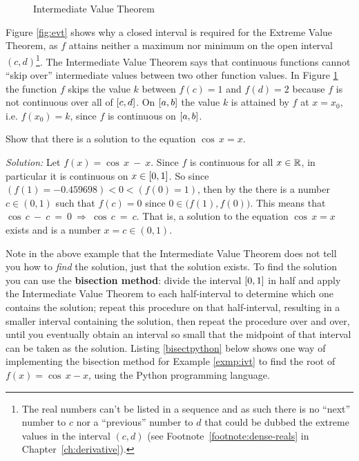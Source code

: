 {\begin{figure}[ht]
\begin{minipage}[b]{8.5cm}
 \caption[]{\quad Intermediate Value Theorem}
 \label{fig:ivt}
\end{minipage}
\end{figure}
\noindent Figure \ref{fig:evt} shows why a closed interval is required for the
Extreme Value Theorem, as $f$ attains neither a maximum nor minimum on the open
interval $(c,d)$\footnote{The real numbers can't be listed in a
sequence and as such there is no ``next'' number to $c$ nor a ``previous''
number to $d$ that could be dubbed the extreme values in the interval
$(c,d)$ (see Footnote~\ref{footnote:dense-reals} in
Chapter~\ref{ch:derivative}).}. The Intermediate Value Theorem says
that continuous functions
cannot ``skip over'' intermediate values between two other function values. In
Figure \ref{fig:ivt} the function $f$ skips the value $k$ between $f(c)=1$ and
$f(d)=2$ because $f$ is not continuous over all of $\lbrack c,d \rbrack$. On
$\lbrack a,b \rbrack$ the value $k$ is attained by $f$ at $x = x_0$, i.e. $f(x_0) = k$,
since $f$ is continuous on $\lbrack a,b \rbrack$.
}
\newpage
\begin{exmp}\label{exmp:ivt}
\noindent Show that there is a solution to the equation $\cos\,x = x$.\vspace{1mm}
\par\noindent\emph{Solution:} Let $f(x) = \cos\,x ~-~ x$. Since $f$ is
continuous for all $x \in \mathbb{R}$, in particular it is continuous on
$x \in \lbrack 0,1 \rbrack$. So since $\left(f(1) = -0.459698\right) < 0 <
\left(f(0) = 1\right)$, then by the  there is a number $c \in (0,1)$ such that $f(c) = 0$ since
$0 \in \big(f(1), f(0)\big)$. This means that $\cos\,c ~-~ c ~=~ 0
~\Rightarrow~ \cos\,c ~=~ c$. That is, a solution to the equation
$\cos\,x = x$ exists and is a number $x = c \in (0,1)$.\vspace{-2mm}
\end{exmp}
\divider
\vspace{2mm}

Note in the above example that the Intermediate Value Theorem does not tell you
how to \emph{find} the solution, just that the solution exists. To find the
solution you can use the \textbf{bisection method}: divide the interval
$\lbrack 0,1 \rbrack$ in half and apply the Intermediate Value Theorem to each
half-interval to determine which one contains the solution; repeat this
procedure on that half-interval, resulting in a smaller interval containing the
solution, then repeat the procedure over and over, until you eventually obtain
an interval so small that the midpoint of that interval can be taken as the
solution. Listing \ref{bisectpython} below shows one way of implementing the
bisection method for Example \ref{exmp:ivt} to find the root of
$f(x) = \cos\,x - x$, using the Python programming language.

